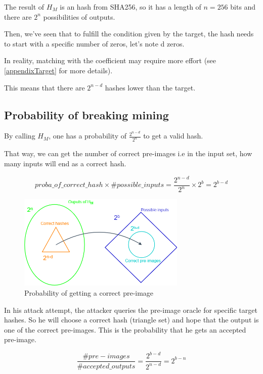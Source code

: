 The result of $H_M$ is an hash from SHA256, so it has a length of $n = 256$ bits and there are $2^n$ possibilities of outputs. \newline

Then, we've seen that to fulfill the condition given by the target, the hash needs to start with a specific number of zeros, let's note d zeros.

In reality, matching with the coefficient may require more effort (see \ref{appendixTarget} for more details). \newline

This means that there are $2^{n-d}$ hashes lower than the target.

	\subsection{Probability of breaking mining}


By calling $H_M$, one has a probability of $\frac{2^{n-d}}{2^n}$ to get a valid hash.

That way, we can get the number of correct pre-images i.e in the input set, how many inputs will end as a correct hash.

\begin{equation}
proba\_of\_correct\_hash \times \#possible\_inputs = \frac{2^{n-d}}{2^n} \times 2^b = 2^{b-d}
\end{equation}
\newline

\begin{figure}[ht]
\centering
\includegraphics[width=8cm]{Figures/probaSuccess}
\caption{Probability of getting a correct pre-image}
\end{figure}
\medskip

In his attack attempt, the attacker queries the pre-image oracle for specific target hashes. So he will choose a correct hash (triangle set) and hope that the output is one of the correct pre-images. This is the probability that he gets an accepted pre-image.

\begin{equation}
\frac{\#pre-images}{\#accepted\_outputs} = \frac{2^{b-d}}{2^{n-d}} = 2^{b-n}
\end{equation}
\newline

